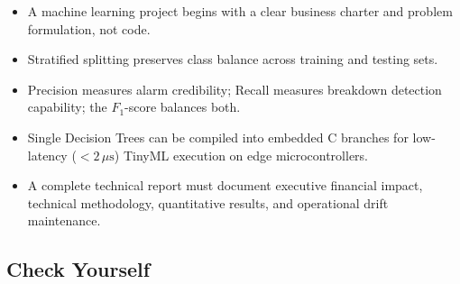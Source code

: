 \begin{takeaways}
\begin{itemize}
    \item A machine learning project begins with a clear business charter and problem formulation, not code.
    \item Stratified splitting preserves class balance across training and testing sets.
    \item Precision measures alarm credibility; Recall measures breakdown detection capability; the $F_1$-score balances both.
    \item Single Decision Trees can be compiled into embedded C  branches for low-latency ($< 2\,\mu\text{s}$) TinyML execution on edge microcontrollers.
    \item A complete technical report must document executive financial impact, technical methodology, quantitative results, and operational drift maintenance.
\end{itemize}
\end{takeaways}

\subsection{Check Yourself}

